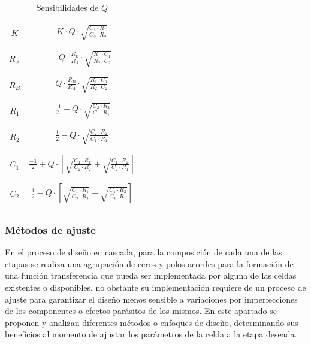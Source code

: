 \begin{table}[H]
	\centering
	\begin{tabular}{c | c}
		\hline \\
		$K$ & $K \cdot Q \cdot \sqrt{\frac{C_1 \cdot R_1}{C_2 \cdot R_2}}$ \\
		\\ \hline \\
		$R_A$ & $-Q \cdot \frac{R_B}{R_A} \cdot \sqrt{\frac{R_1 \cdot C_1}{R_2 \cdot C_2}}$ \\
		\\ \hline \\
		$R_B$ & $Q \cdot \frac{R_B}{R_A} \cdot \sqrt{\frac{R_1 \cdot C_1}{R_2 \cdot C_2}}$ \\
		\\ \hline \\
		$R_1$ & $\frac{-1}{2} + Q \cdot \sqrt{\frac{C_2 \cdot R_2}{C_1 \cdot R_1}}$ \\
		\\ \hline \\
		$R_2$ & $\frac{1}{2} - Q \cdot \sqrt{\frac{C_2 \cdot R_2}{C_1 \cdot R_1}}$ \\
		\\ \hline \\
		$C_1$ & $\frac{-1}{2} + Q \cdot \left[ \sqrt{\frac{C_1 \cdot R_1}{C_2 \cdot R_2}} + \sqrt{\frac{C_1 \cdot R_2}{C_2 \cdot R_1}} \right]$ \\
		\\ \hline \\
		$C_2$ & $\frac{1}{2} - Q \cdot \left[ \sqrt{\frac{C_1 \cdot R_1}{C_2 \cdot R_2}} + \sqrt{\frac{C_1 \cdot R_2}{C_2 \cdot R_1}} \right]$ \\
		\\ \hline
	\end{tabular}
	\caption{Sensibilidades de $Q$}
\end{table}

\subsubsection{M\'etodos de ajuste}
En el proceso de dise\~no en cascada, para la composici\'on de cada una de las etapas se realiza una agrupaci\'on de ceros y polos acordes para la formaci\'on de una 
funci\'on transferencia que pueda ser implementada por alguna de las celdas existentes o disponibles, no obstante su implementaci\'on requiere de un proceso de ajuste para garantizar
el dise\~no menos sensible a variaciones por imperfecciones de los componentes o efectos par\'asitos de los mismos. En este apartado se proponen y analizan diferentes m\'etodos o enfoques de dise\~no, 
determinando sus beneficios al momento de ajustar los par\'ametros de la celda a la etapa deseada.

